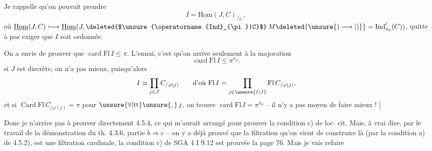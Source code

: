 Je rappelle qu'on pouvait prendre
\[ I=\underline{\mathrm{Hom}}(J,C)_{/\varphi}\,, \]
où $\underline{\mathrm{Hom}}(J,C)\lhook\joinrel\longrightarrow\underline{\mathrm{Hom}}(J,\text{\deleted{$\unsure{\operatorname{Ind}_{\pi}|C}$}}\,M\deleted{\unsure{)\longrightarrow|)}}=\operatorname{Ind}'_{\pi_0}(C))$, quitte à  pas exiger que $I$ soit ordonnée.

On a envie de prouver que $\operatorname{card}\mathrm{Fl}\,I\leq\pi$. L'ennui, c'est qu'on arrive seulement à la majoration
\[ \operatorname{card}\mathrm{Fl}\,I\leq\pi^{\pi_0}. \]
 
si $J$ est discrète, on n'a pas mieux, puisqu'alors
\[ I\simeq\prod_{j\in J} C_{/\varphi(j)}
\qquad\text{d'où }\mathrm{Fl}\,I=\prod_{j\in\unsure{I|J}}\mathrm{Fl}\,C_{/\varphi(j)}, \]
et si $\operatorname{Card}\mathrm{Fl}\,C_{/\varphi(j)}=\pi$ pour $\unsure{\forall|\mathrm{tt}}\unsure{,}\,j$, on trouve $\operatorname{card}\mathrm{Fl}\,I=\pi^{\pi_0}$ -- il n'y a pas moyen de faire mieux ! ]

Donc je n'arrive pas à prouver directement 4.5.4, ce qui m'aurait arrangé pour prouver la condition c) de loc. cit.
Mais, à vrai dire,    par le travail de la démonstration du th. 4.3.6, partie $b\Rightarrow c$ -- on y a déjà prouvé que la filtration qu'on vient de construire là (par la condition a)  de 4.5.2), est une filtration cardinale,  la condition c) de SGA 4 I 9.12 est prouvée  la page 76. Mais je vais refaire
